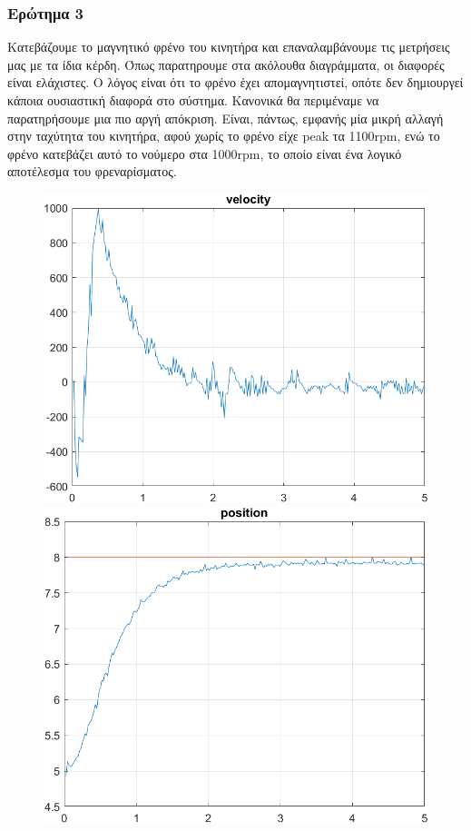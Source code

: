 \subsubsection{Ερώτημα 3}
Κατεβάζουμε το μαγνητικό φρένο του κινητήρα και επαναλαμβάνουμε τις μετρήσεις μας με τα ίδια κέρδη. Όπως παρατηρουμε στα ακόλουθα διαγράμματα, οι διαφορές είναι ελάχιστες. Ο λόγος είναι ότι το φρένο έχει απομαγνητιστεί, οπότε δεν δημιουργεί κάποια ουσιαστική διαφορά στο σύστημα. Κανονικά θα περιμέναμε να παρατηρήσουμε μια πιο αργή απόκριση. Είναι, πάντως, εμφανής μία μικρή αλλαγή στην ταχύτητα του κινητήρα, αφού χωρίς το φρένο είχε peak τα 1100rpm, ενώ το φρένο κατεβάζει αυτό το νούμερο στα 1000rpm, το οποίο είναι ένα λογικό αποτέλεσμα του φρεναρίσματος.

\begin{figure}[H]
    \centering
    \begin{minipage}{0.45\textwidth}
        \includegraphics[width=\linewidth]{Images/lab2/3/vel223.png}
    \end{minipage}
    \hfill
    \begin{minipage}{0.45\textwidth}
        \includegraphics[width=\linewidth]{Images/lab2/3/pos223.png}
    \end{minipage}
    

\end{figure}
